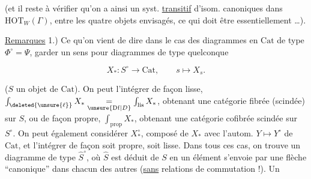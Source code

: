 (et il reste à vérifier qu'on a ainsi un syst. \uline{transitif} d'isom. canoniques dans $\mathrm{HOT}_W(\Gamma)$, entre les quatre objets envisagés, \deleted{\unsure{)}} ce qui doit être essentiellement \ldots).

\uline{Remarques} 1.) Ce qu'on vient de dire dans le cas des diagrammes en $\mathrm{Cat}$ de type $\Phi^\circ=\Psi$,  garder un sens pour  diagrammes de type quelconque

\[
X_*:S^\circ\longrightarrow\mathrm{Cat},\qquad s\longmapsto X_s .
\]

($S$ un objet de $\mathrm{Cat}$). On peut l'intégrer de façon lisse, $\int_{\deleted{\unsure{\ell}}}X_*\underset{\unsure{\mathrm{Df}|{D}}}{=}\int_{\mathrm{lis}}X_*$, obtenant une catégorie fibrée (scindée) sur $S$, ou de façon propre, $\int_{\mathrm{prop}}X_*$, obtenant une catégorie cofibrée scindée sur $S^\circ$. On peut également considérer $X_*^\circ$, composé de $X_*$ avec l'autom. $Y\longmapsto Y^\circ$ de $\mathrm{Cat}$, et l'intégrer de façon soit propre, soit lisse. Dans tous ces cas, on trouve un diagramme de type $\widehat S^\circ$, où $\widehat S$ est déduit de $S$ en  un élément      s'envoie par une flèche ``canonique''  dans chacun des autres (\uline{sans} relations de commutation !). Un
